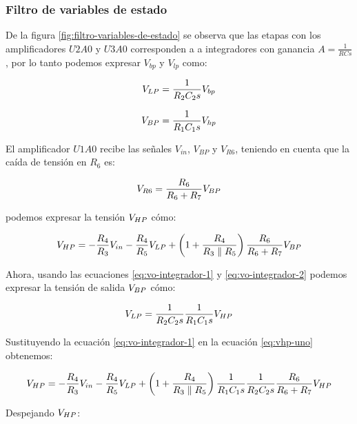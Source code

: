 \FloatBarrier
\subsubsection{Filtro de variables de estado}

De la figura \ref{fig:filtro-variables-de-estado} se observa que las etapas con los amplificadores $U2A0$ y $U3A0$ corresponden a a integradores con ganancia $A = \frac{1}{RCs}$, por lo tanto podemos expresar $V_{bp}$ y $V_{lp}$ como:

\begin{equation}
    V_{LP} = \frac{1}{R_2 C_2 s}V_{bp}
    \label{eq:vo-integrador-2}
\end{equation}

\begin{equation}
    V_{BP} = \frac{1}{R_1 C_1 s}V_{hp}
    \label{eq:vo-integrador-1}
\end{equation}

El amplificador $U1A0$ recibe las señales $V_{in}$, $V_{BP}$ y $V_{R6}$, teniendo en cuenta que la caída de tensión en $R_6$ es:

$$V_{R6} = \frac{R_6}{R_6 + R_7}V_{BP}$$

podemos expresar la tensión $V_{HP}$ cómo:

\begin{equation}
    V_{HP} = -\frac{R_4}{R_3}V_{in} -\frac{R_4}{R_5}V_{LP} + \left (1 + \frac{R_4}{R_3 \parallel R_5}\right )\frac{R_6}{R_6 + R_7}V_{BP}
    \label{eq:vhp-uno}
\end{equation}

Ahora, usando las ecuaciones \ref{eq:vo-integrador-1} y \ref{eq:vo-integrador-2} podemos expresar la tensión de salida $V_{BP}$ cómo:

\begin{equation}
    V_{LP} = \frac{1}{R_2 C_2 s} \frac{1}{R_1 C_1 s}V_{HP}
    \label{eq:vlp-ambos-integradores}
\end{equation}

Sustituyendo la ecuación \ref{eq:vo-integrador-1} en la ecuación \ref{eq:vhp-uno} obtenemos:

\begin{equation}
    V_{HP} = -\frac{R_4}{R_3}V_{in} -\frac{R_4}{R_5}V_{LP} + \left( 1 + \frac{R_4}{R_3 \parallel R_5} \right)\frac{1}{R_1 C_1 s}\frac{1}{R_2 C_2 s}\frac{R_6}{R_6 + R_7}V_{HP}
    \label{eq:vhp-dos}
\end{equation}

Despejando $V_{HP}$:

\newcommand{\VHPEq}{
    - \frac{\frac{R_4}{R_3}\VIN + \frac{R_4}{R_5}\VLP}{1 + \frac{R_6}{R_6 + R_7} \WrapParenthesis{1 + \frac{R_4}{R_3 \parallel R_5}}\frac{1}{R_1 C_1 s}}
}
\newcommand{\Numerador}{\frac{R_4}{R_3}\VIN + \frac{R_4}{R_5}\VLP}

